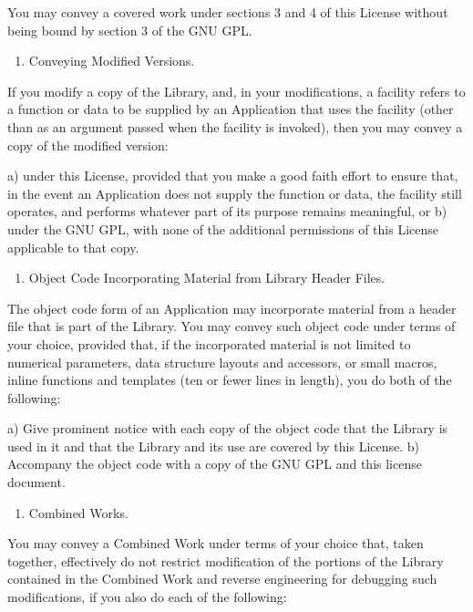 \documentclass[a4paper,DIV=11
]{scrartcl}
\newcommand{\NormalTok}[1]{#1}
\begin{document}
You may convey a covered work under sections 3 and 4 of this License
without being bound by section 3 of the GNU GPL.

\begin{enumerate}
\def\labelenumi{\arabic{enumi}.}
\item
  Conveying Modified Versions.
\end{enumerate}

If you modify a copy of the Library, and, in your modifications, a
facility refers to a function or data to be supplied by an Application
that uses the facility (other than as an argument passed when the
facility is invoked), then you may convey a copy of the modified
version:

\NormalTok{a) under this License, provided that you make a good faith effort to ensure that, in the event an Application does not supply the function or data, the facility still operates, and performs whatever part of its purpose remains meaningful, or}
\NormalTok{b) under the GNU GPL, with none of the additional permissions of this License applicable to that copy.}

\begin{enumerate}
\def\labelenumi{\arabic{enumi}.}
\item
  Object Code Incorporating Material from Library Header Files.
\end{enumerate}

The object code form of an Application may incorporate material from a
header file that is part of the Library. You may convey such object code
under terms of your choice, provided that, if the incorporated material
is not limited to numerical parameters, data structure layouts and
accessors, or small macros, inline functions and templates (ten or fewer
lines in length), you do both of the following:


\NormalTok{a) Give prominent notice with each copy of the object code that the Library is used in it and that the Library and its use are covered by this License.}
\NormalTok{b) Accompany the object code with a copy of the GNU GPL and this license document.}


\begin{enumerate}
\def\labelenumi{\arabic{enumi}.}
\item
  Combined Works.
\end{enumerate}

You may convey a Combined Work under terms of your choice that, taken
together, effectively do not restrict modification of the portions of
the Library contained in the Combined Work and reverse engineering for
debugging such modifications, if you also do each of the following:
\end{document}
